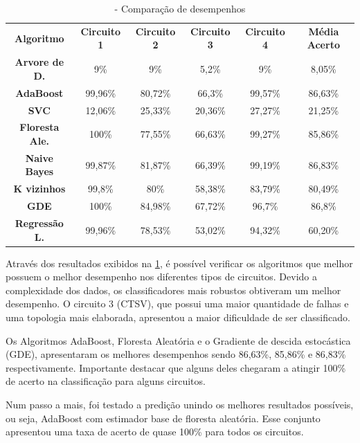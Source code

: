 \begin{table}[H]
\centering
\begin{tabular}{cccccc}
\textbf{Algoritmo}     & \textbf{Circuito 1} & \textbf{Circuito 2} & \textbf{Circuito 3} & \textbf{Circuito 4} & \textbf{Média Acerto}           \\
\textbf{Arvore de D.}  & 9\%                 & 9\%                 & 5,2\%               & 9\%                 & 8,05\%                          \\
\textbf{AdaBoost}      & 99,96\%             & 80,72\%             & 66,3\%              & 99,57\%             & 86,63\% \\
\textbf{SVC}           & 12,06\%             & 25,33\%             & 20,36\%             & 27,27\%             & 21,25\%                         \\
\textbf{Floresta Ale.} & 100\%               & 77,55\%             & 66,63\%             & 99,27\%             & 85,86\%                         \\
\textbf{Naive Bayes}   & 99,87\%             & 81,87\%             & 66,39\%             & 99,19\%             & 86,83\% \\
\textbf{K vizinhos}    & 99,8\%              & 80\%                & 58,38\%             & 83,79\%             & 80,49\%                         \\
\textbf{GDE}           & 100\%               & 84,98\%             & 67,72\%             & 96,7\%              &86,8\%  \\
\textbf{Regressão L.}  & 99,96\%             & 78,53\%             & 53,02\%             & 94,32\%             & 60,20\%                        
\end{tabular}
\caption{\label{tab:resultadoFinal}- Comparação de desempenhos}
\end{table}


Através dos resultados exibidos na \ref{tab:resultadoFinal}, é possível verificar os algoritmos que melhor possuem o melhor desempenho nos diferentes tipos de circuitos. Devido a complexidade dos dados, os classificadores mais robustos obtiveram um melhor desempenho. O circuito 3 (CTSV), que possui uma maior quantidade de falhas e uma topologia mais elaborada, apresentou a maior dificuldade de ser classificado.

Os Algoritmos AdaBoost, Floresta Aleatória e o Gradiente de descida estocástica (GDE), apresentaram os melhores desempenhos sendo 86,63\%, 85,86\% e 86,83\% respectivamente. Importante destacar que alguns deles chegaram a atingir 100\% de acerto na classificação para alguns circuitos. 

Num passo a mais, foi testado a predição unindo os melhores resultados possíveis, ou seja, AdaBoost com estimador base de floresta aleatória. Esse conjunto apresentou uma taxa de acerto de quase 100\% para todos os circuitos.
